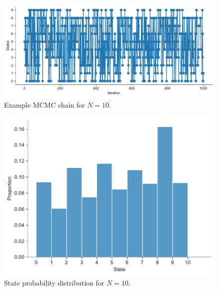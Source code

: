\begin{figure}
    \centering
    \includegraphics[width=0.8\linewidth]{data/05_reporting/problem_set_2/walk_plot.pdf}
    \caption{Example MCMC chain for $N=10$.}
    \label{fig:walk-plot}
\end{figure}


\begin{figure}
    \centering
    \includegraphics[width=\linewidth]{data/05_reporting/problem_set_2/state_probability.pdf}
    \caption{State probability distribution for $N=10$.}
    \label{fig:enter-label}
\end{figure}

